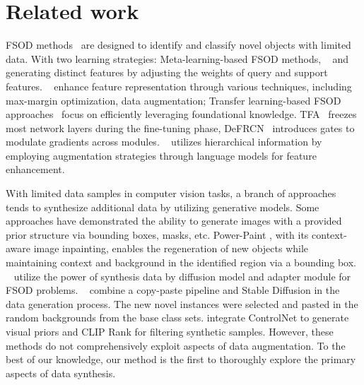\section{Related work}
\label{sec:related_word}
FSOD methods~\cite{meta-rcnn, yolo-reweighting, rpn-attention, TFA, max-margin, trans-int, meta-detr, han2022few, bulat2023fs} are designed to identify and classify novel objects with limited data. With two learning strategies: Meta-learning-based FSOD methods, ~\cite{meta-rcnn} and ~\cite{yolo-reweighting} generating distinct features by adjusting the weights of query and support features. ~\cite{max-margin, trans-int, rpn-attention, hu2021dense, meta-detr, han2022few, bulat2023fs} enhance feature representation through various techniques, including max-margin optimization, data augmentation; Transfer learning-based FSOD approaches~\cite{TFA, defrcn, guirguis2023niff, zhu2021semantic, li2023disentangle,vu2023instance, xu2023generating} focus on efficiently leveraging foundational knowledge. TFA~\cite{TFA} freezes most network layers during the fine-tuning phase, DeFRCN~\cite{defrcn} introduces gates to modulate gradients across modules. ~\cite{vu2023instance} utilizes hierarchical information by employing augmentation strategies through language models for feature enhancement.
 

With limited data samples in computer vision tasks, a branch of approaches tends to synthesize additional data by utilizing generative models. Some approaches \cite{li2023gligen, zhuang2023task} have demonstrated the ability to generate images with a provided prior structure via bounding boxes, masks, etc. Power-Paint \cite{zhuang2023task}, with its context-aware image inpainting, enables the regeneration of new objects while maintaining context and background in the identified region via a bounding box. ~\cite{lin2023explore, fang2024data} utilize the power of synthesis data by diffusion model and adapter module for FSOD problems. ~\cite{lin2023explore} combine a copy-paste pipeline and Stable Diffusion \cite{rombach2022high} in the data generation process. The new novel instances were selected and pasted in the random backgrounds from the base class sets. \cite{fang2024data} integrate ControlNet to generate visual priors and CLIP Rank for filtering synthetic samples. However, these methods do not comprehensively exploit aspects of data augmentation. To the best of our knowledge, our method is the first to thoroughly explore the primary aspects of data synthesis.